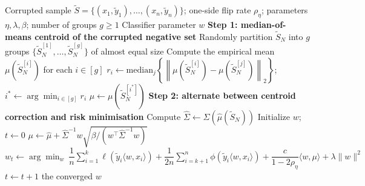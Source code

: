 \documentclass{article}
\begin{document}
\begin{algorithm}[!h]
\renewcommand{\algorithmicrequire}{\textbf{Input:}}
\renewcommand{\algorithmicensure}{\textbf{Output:}}
	\caption{LDCE (loss decomposition and centroid estimation for PU learning)}
	\begin{algorithmic}[1]
	    \REQUIRE
	    Corrupted sample $\tilde{S}=\{(x_{1},\tilde{y}_{1}),\dots,(x_{n},\tilde{y}_{n})\}$;
	    one-side flip rate $\rho_{\eta}$; parameters $\eta,\lambda,\beta$; number of groups $g\geq 1$
	    \ENSURE
	    Classifier parameter $w$
	    \STATE \textbf{Step 1: median-of-means centroid of the corrupted negative set} %
	    \STATE Randomly partition $\tilde{S}_{N}$ into $g$ groups $\{\tilde{S}_{N}^{[1]},\dots,\tilde{S}_{N}^{[g]}\}$ of almost equal size
	    \STATE Compute the empirical mean $\mu(\tilde{S}_{N}^{[i]})$ for each $i\in[g]$
	    \STATE $r_{i}\leftarrow \mathrm{median}_{j}\left\{\left\|\mu(\tilde{S}_{N}^{[i]})-\mu(\tilde{S}_{N}^{[j]})\right\|_{2}\right\}$;\quad
	    $i^{\ast}\leftarrow \arg\min_{i\in[g]}r_{i}$ %
	    \STATE $\hat{\mu}\leftarrow \mu(\tilde{S}_{N}^{[i^{\ast}]})$
	    \STATE \textbf{Step 2: alternate between centroid correction and risk minimisation}
	    \STATE Compute $\hat{\Sigma}\leftarrow \hat{\Sigma}(\hat{\mu}(\tilde{S}_{N}))$
	    \STATE Initialize $w$; $t\leftarrow 0$
	    \REPEAT
	    \STATE $\mu\leftarrow \hat{\mu}+\hat{\Sigma}^{-1}w\sqrt{\beta/(w^{\top}\hat{\Sigma}^{-1}w)}$ %
	    \STATE $w_{t}\leftarrow \arg\min_{w}\ \dfrac{1}{n}\sum_{i=1}^{k}\ell(\tilde{y}_{i}\langle w,x_{i}\rangle)
	    +\dfrac{1}{2n}\sum_{i=k+1}^{n}\phi(\tilde{y}_{i}\langle w,x_{i}\rangle)
	    +\dfrac{c}{1-2\rho_{\eta}}\langle w,\mu\rangle+\lambda\|w\|^{2}$ %
	    \STATE $t\leftarrow t+1$
		\RETURN the converged $w$
	\end{algorithmic}
\end{algorithm}
\end{document}
